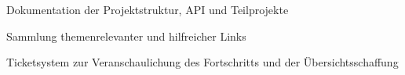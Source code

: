 \begin{frame}
\begin{block}{}
	Dokumentation der Projektstruktur, API und Teilprojekte
\end{block}
\begin{block}{}
	Sammlung themenrelevanter und hilfreicher Links
\end{block}
\begin{block}{}
	Ticketsystem zur Veranschaulichung des Fortschritts und der Übersichtsschaffung
\end{block}
\end{frame}